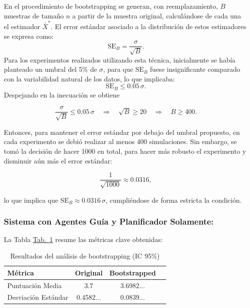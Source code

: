\documentclass[10pt]{llncs}
\newcommand{\tabref}[1]{\hyperref[#1]{Tab.~\ref*{#1}}}
\begin{document}
En el procedimiento de bootstrapping se generan, con reemplazamiento, $B$ muestras de tamaño $n$ a partir de la muestra original, calculándose de cada una el estimador $\bar{X}^*$.
El error estándar asociado a la distribución de estos estimadores se expresa como:
\begin{equation}
\text{SE}_B = \frac{\sigma}{\sqrt{B}}.
\end{equation}
Para los experimentos realizados utilizando esta técnica, inicialmente se había planteado un umbral del 5\% de $\sigma$, para que $\text{SE}_B$ fuese insignificante comparado con la variabilidad natural de los datos, lo que implicaba:
\begin{equation}
\text{SE}_B \leq 0.05\,\sigma.
\end{equation}
Despejando en la inecuación se obtiene


\[
\frac{\sigma}{\sqrt{B}} \leq 0.05\,\sigma \quad \Longrightarrow \quad \sqrt{B} \geq 20 \quad \Longrightarrow \quad B \geq 400.
\]


Entonces, para mantener el error estándar por debajo del umbral propuesto, en cada experimento se debió realizar al menos 400 simulaciones. Sin embargo, se tomó la decisión de 
hacer 1000 en total, para hacer más robusto el experimento y disminuir aún más el error estándar:


\[
\frac{1}{\sqrt{1000}} \approx 0.0316,
\]


lo que implica que $\text{SE}_B\approx 0.0316\,\sigma$, cumpliéndose de forma estricta la condición.


\subsubsection{Sistema con Agentes Guía y Planificador Solamente:}

La Tabla \tabref{tab:boot_results_1} resume las métricas clave obtenidas:

\begin{table}[h]
\centering
\caption{Resultados del análisis de bootstrapping (IC 95\%)}
\label{tab:boot_results_1}
\begin{tabular}{lccc}
\hline
\textbf{Métrica} & \textbf{Original} & \textbf{Bootstrapped}  \\
\hline 
Puntuación Media& 3.7 & 3.6982...  \\
Desviación Estándar & 0.4582... & 0.0839...  \\
\hline
\end{tabular}
\end{table}
\end{document}
